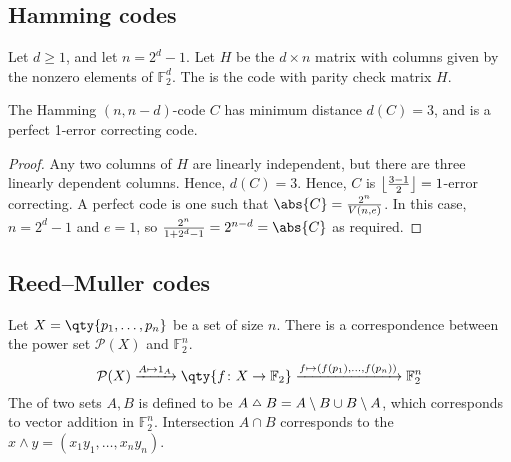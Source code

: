 \subsection{Hamming codes}
\begin{definition}
    Let $d \geq 1$, and let $n = 2^d - 1$.
    Let $H$ be the $d \times n$ matrix with columns given by the nonzero elements of $\mathbb F_2^d$.
    The  is the code with parity check matrix $H$.
\end{definition}
\begin{lemma}
    The Hamming $(n, n-d)$-code $C$ has minimum distance $d(C) = 3$, and is a perfect 1-error correcting code.
\end{lemma}
\begin{proof}
    Any two columns of $H$ are linearly independent, but there are three linearly dependent columns.
    Hence, $d(C) = 3$.
    Hence, $C$ is $\floor*{\frac{3-1}{2}} = 1$-error correcting.
    A perfect code is one such that $\abs{C} = \frac{2^n}{V(n,e)}$.
    In this case, $n = 2^d - 1$ and $e = 1$, so $\frac{2^n}{1 + 2^d - 1} = 2^{n-d} = \abs{C}$ as required.
\end{proof}

\subsection{Reed--Muller codes}
Let $X = \qty{p_1, \dots, p_n}$ be a set of size $n$.
There is a correspondence between the power set $\mathcal P(X)$ and $\mathbb F_2^n$.
\[ \mathcal P(X) \xrightarrow{A \mapsto 1_A} \qty{f \colon X \to \mathbb F_2} \xrightarrow{f \mapsto (f(p_1), \dots, f(p_n))} \mathbb F_2^n \]
The  of two sets $A, B$ is defined to be $A \symmdiff B = A\setminus B \cup B \setminus A$, which corresponds to vector addition in $\mathbb F_2^n$.
Intersection $A \cap B$ corresponds to the  $x \wedge y = (x_1 y_1, \dots, x_n y_n)$.

